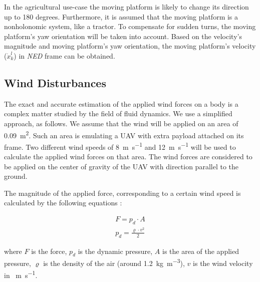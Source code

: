 \documentclass[conference, onecolumn, draftclsnofoot]{IEEEtran}
\begin{document}

In the agricultural use-case the moving platform is likely to change
its direction up to 180 degrees. Furthermore, it is assumed that the
moving platform is a nonholonomic system, like a tractor. To
compensate for sudden turns, the moving platform's yaw orientation
will be taken into account. Based on the velocity's magnitude and moving platform's yaw orientation, the
moving platform's velocity (\(\dot{x}_k^l\)) in \emph{NED} frame can be obtained.





\subsection{Wind Disturbances}
\label{sec:WindDisturbances}
The exact and accurate estimation of the applied wind forces on a body
is a complex matter studied by the field of fluid dynamics. We use a
simplified approach, as follows. We assume that the wind will be
applied on an area of \SI{0.09}{\m^2}. Such an area is emulating a UAV
with extra payload attached on its frame. Two different wind speeds of
\SI{8}{\m \per \s} and \SI{12}{\m \per \s} will be used to calculate the applied wind forces
on that area. The wind forces are considered to be applied on the
center of gravity of the UAV with direction parallel to the ground.

The magnitude of the applied force, corresponding to a certain wind
speed is calculated by the following equations
\cite{Dynamic_pressure_NASA,anderson2010fundamentals}:

\begin{equation}
    \begin{array}{l}
         F = p_{d} \cdot A  \\
         p_{d} = \frac{\varrho \cdot v^2}{2} 
    \end{array}
\end{equation}

\noindent where $F$ is the force, \(p_{d}\) is the dynamic pressure, \(A\) is
the area of the applied pressure, \(\varrho\) is the density of the
air (around \SI{1.2}{\kg \per \m^3}), \(v\) is the wind velocity in \SI{}{\m \per \s}.
\end{document}
